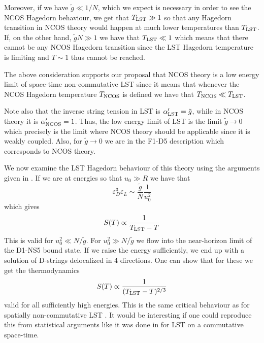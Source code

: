 \documentclass[a4paper,twoside,titlepage,12pt]{article}
\begin{document}
Moreover, if we have \( \tilde{g} \ll 1/N \), which we expect is 
necessary in order to see the NCOS Hagedorn behaviour, we get
that \( T_{\rm LST} \gg 1 \) so that any Hagedorn transition in NCOS theory
would happen at much lower temperatures than \( T_{\rm LST} \).
If, on the other hand, \( \tilde{g} N \gg 1 \) we have that
\( T_{\rm LST} \ll 1 \) which means that there cannot be any NCOS
Hagedorn transition since the LST Hagedorn temperature 
is limiting \cite{Harmark:2000hw,Berkooz:2000mz} and \( T \sim 1 \)
thus cannot be reached. 

The above consideration supports our proposal 
that NCOS theory is a low energy limit of space-time non-commutative LST since 
it means that whenever the NCOS Hagedorn temperature \( T_{\rm NCOS} \)
is defined we have that \( T_{\rm NCOS }  \ll T_{\rm LST} \).

Note also that the inverse string tension in LST is 
\( \alpha'_{\rm LST} = \tilde{g} \), while in NCOS theory it is
\( \alpha'_{\rm NCOS} = 1 \).
Thus, the low energy limit of LST is the limit \( \tilde{g} \rightarrow 0 \)
which precisely is the limit where NCOS theory should be applicable since
it is weakly coupled. Also, for \( \tilde{g} \rightarrow 0 \)
we are in the F1-D5 description which corresponds to NCOS theory.

We now examine the LST Hagedorn behaviour of this theory using the arguments
given in \cite{Harmark:2000hw}. 
If we are at energies so that \( u_0 \gg R \) we have that 
%
\begin{equation}
\varepsilon_D^3 \varepsilon_L \sim \frac{\tilde{g}}{N} \frac{1}{u_0^2}
\end{equation}
%
which gives 
%
\begin{equation}
S(T) \propto \frac{1}{T_{\rm LST}-T}
\end{equation}
%
This is valid for \( u_0^2 \ll N/\tilde{g} \).
For \( u_0^2 \gg N/\tilde{g} \) we flow into the near-horizon
limit of the D1-NS5 bound state.
If we raise the energy sufficiently, we end up with 
a solution of D-strings delocalized in 4 directions.
One can show that for these we get the thermodynamics
%
\begin{equation}
S(T) \propto \frac{1}{(T_{\rm LST} - T )^{2/3}} 
\end{equation}
%
valid for all sufficiently high energies.
This is the same critical behaviour as for spatially non-commutative
LST \cite{Harmark:2000hw,Correia:2000}.
It would be interesting if one could reproduce this from 
statistical arguments 
like it was done in \cite{Harmark:2000hw,Berkooz:2000mz}
for LST on a commutative space-time.
\end{document}
